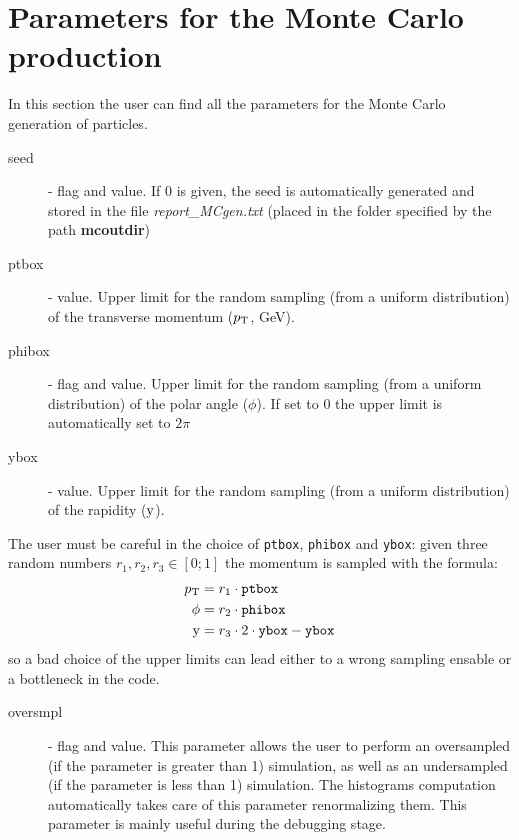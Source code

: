 \section{Parameters for the Monte Carlo production}
In this section the user can find all the parameters for the Monte Carlo generation of particles. 
  \begin{description}
  \item[seed] \integer - flag and value. If 0 is given, the seed is automatically 
  generated and stored in the file \textit{report\_MCgen.txt} (placed in the folder specified by the path \textbf{mcoutdir})
  \item[ptbox] \real - value. Upper limit for the random sampling (from a uniform distribution) of the transverse momentum ($p_\mathrm{T}$, GeV).
  \item[phibox] \real - flag and value. Upper limit for the random sampling (from a uniform distribution) of the polar angle ($\phi$). If set to 0 the upper limit is automatically set to $2\pi$
  \item[ybox] \real - value. Upper limit for the random sampling (from a uniform distribution) of the rapidity ($\mathrm{y}$). 
  \end{description}
The user must be careful in the choice of {\tt ptbox},  {\tt phibox} and {\tt ybox}: given three random numbers $r_1, r_2, r_3 \in [0;1]$ the momentum is sampled with the formula:
\begin{align}
p_\mathrm{T} &=  r_1\cdot {\tt ptbox}\\
\phi &= r_2\cdot {\tt phibox}\\
\mathrm{y} &=  r_3\cdot 2\cdot {\tt ybox} -{\tt ybox}
\end{align}
so a bad choice of the upper limits can lead either to a wrong sampling ensable or a bottleneck in the code.
\begin{description}
  \item[oversmpl] \real - flag and value. This parameter allows the user to perform an oversampled (if the parameter is greater than 1) simulation, as well as an undersampled (if the parameter is less than 1) simulation. The histograms computation automatically takes care of this parameter renormalizing them. This parameter is mainly useful during the debugging stage.   
\end{description}

